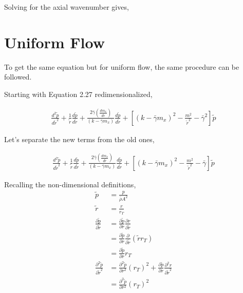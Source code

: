 \documentclass[a4paper]{article}
\begin{document}
Solving for the axial wavenumber gives,
\section{Uniform Flow}

To get the same equation but for uniform flow, the same procedure can be followed.

Starting with Equation 2.27 redimensionalized, 

\begin{align*}
    \frac{ d^2 \tilde{p}}{d \tilde{r}^2} +
    \frac{1}{\tilde{r}} 
    \frac{d \tilde{p}}{d \tilde{r}} + 
    \frac{2 \bar{\gamma} \left( \frac{d m_x}{d \tilde{r}} \right)}
    {\left( k - \bar{\gamma} m_x \right)}\frac{d \tilde{p}}{d \tilde{r}}+
    \left[ \left( k - \bar{\gamma} m_x \right)^2 - \frac{m^2}{\tilde{r}^2}- 
    \bar{\gamma}^2 \right] \tilde{p}
\end{align*}

Let's separate the new terms from the old ones, 

\begin{align*}
    \frac{ d^2 \tilde{p}}{d \tilde{r}^2} +
    \frac{1}{\tilde{r}} 
    \frac{d \tilde{p}}{d \tilde{r}} + 
    \frac{2 \bar{\gamma} \left( \frac{d m_x}{d \tilde{r}} \right)}
    {\left( k - \bar{\gamma} m_x \right)}\frac{d \tilde{p}}{d \tilde{r}}+
    \left[ \left( k - \bar{\gamma} m_x \right)^2 - \frac{m^2}{\tilde{r}^2}- 
    \bar{\gamma} \right] \tilde{p}
\end{align*}


Recalling the non-dimensional definitions,
\begin{align*}
    \tilde{p} &= \frac{p}{\bar{\rho} A^2} \\
    \tilde{r} &= \frac{r}{r_T} \\
    \frac{\partial \tilde{p}}{\partial \tilde{r}} &= 
    \frac{ \partial \tilde{p}}{\partial r} \frac{\partial r}{ \partial \tilde{r}}  \\ 
    &= \frac{ \partial \tilde{p}}{\partial r} \frac{\partial }{ \partial \tilde{r}} \left( \tilde{r} r_T \right) \\
    &= 
    \frac{ \partial \tilde{p}}{\partial r}  r_T \\
    \frac{\partial^2 \tilde{p}}{\partial \tilde{r}^2} &= 
    \frac{ \partial^2 \tilde{p}}{\partial r^2}  (r_T)^2+ 
    \frac{ \partial \tilde{p}}{\partial r} \frac{\partial^2 r}{ \partial \tilde{r}^2} \\
    &= \frac{ \partial^2 \tilde{p}}{\partial r^2}  (r_T)^2 
\end{align*}
\end{document}
